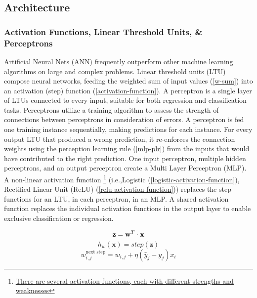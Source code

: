 \documentclass[12pt]{article}
\begin{document}
\subsection{Architecture} \label{nn-architecture}
\subsubsection*{Activation Functions, Linear Threshold Units, \& Perceptrons}\label{mlp-math}
Artificial Neural Nets (ANN) frequently outperform other machine learning algorithms on large and complex problems.
Linear threshold units (LTU) compose neural networks, feeding the weighted sum of input values (\ref{w-sum}) into an activation (step) function (\ref{activation-function}).
A perceptron is a single layer of LTUs connected to every input, suitable for both regression and classification tasks.
Perceptrons utilize a training algorithm to assess the strength of connections between perceptrons in consideration of errors.
A perceptron is fed one training instance sequentially, making predictions for each instance.
For every output LTU that produced a wrong prediction, it re-enforces the connection weights using the perception learning rule (\ref{mlp-plr}) from the inputs that would have contributed to the right prediction.
One input perceptron, multiple hidden perceptrons, and an output perceptron create a Multi Layer Perceptron (MLP).
A non-linear activation function \footnote{\href{https://towardsdatascience.com/7-popular-activation-functions-you-should-know-in-deep-learning-and-how-to-use-them-with-keras-and-27b4d838dfe6}{There are several activation functions, each with different strengths and weaknesses}} (i.e.,Logistic (\ref{logistic-activation-function}), Rectified Linear Unit (ReLU) (\ref{relu-activation-function})) replaces the step functions for an LTU, in each perceptron, in an MLP.
A shared activation function replaces the individual activation functions in the output layer to enable exclusive classification or regression.
\begin{multicols}{3}
\noindent
    \begin{equation}
        \textbf{z} =\textbf{w}^{T} \cdot \textbf{x}\\
		\label{w-sum}
	\end{equation}
	\begin{equation}
		h_{w}(\textbf{x})=step(\textbf{z})
		\label{activation-function}
	\end{equation}
	\begin{equation}
		w_{i,j}^{\text{next step}} = w_{i,j} + \eta (\hat{y}_j - y_j)x_i 
		\label{mlp-plr}
    \end{equation}
\end{multicols}
\end{document}
